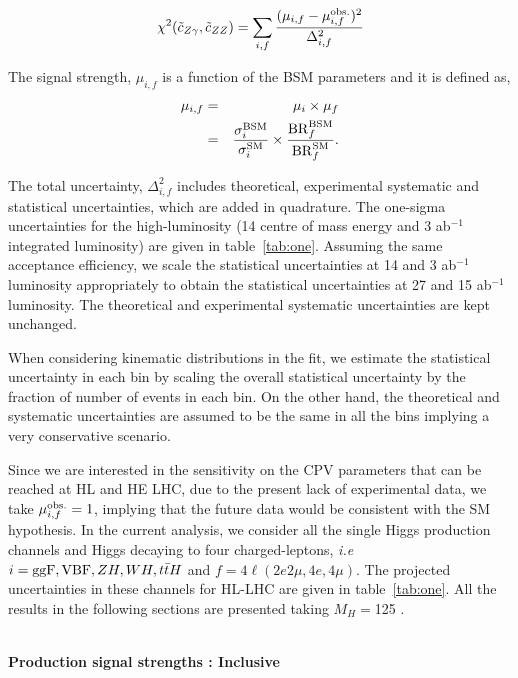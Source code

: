 \begin{equation}
 \chi^2(\tilde c_{Z\gamma},\tilde c_{ZZ}) = \sum_{i,f} \frac{(\mu_{i,f} -\mu_{i,f}^{\rm obs.})^2}{\Delta_{i,f}^2}
\end{equation}
{
The signal strength, $\mu_{i,f}$ is a function of the BSM parameters and it is defined as, 
\begin{eqnarray}
 \mu_{i,f} &=& \mu_i \times \mu_f \\
         &=& \frac{\sigma_i^{\rm BSM}}{\sigma_i^{\rm SM}} \times \frac{{\rm BR}_f^{ \rm BSM}}{{\rm BR}_f^{ \rm SM}}.
\end{eqnarray}

The total uncertainty, $\Delta_{i,f}^2$ includes theoretical, experimental systematic and statistical uncertainties, which 
are added in quadrature.
The one-sigma uncertainties for the high-luminosity (14 \UTeV centre of mass energy and 3 ab$^{-1}$ integrated luminosity) are given in table~\ref{tab:one}. 
Assuming the same acceptance efficiency, we scale the statistical uncertainties at 14 \UTeV and 3 ab$^{-1}$ luminosity appropriately 
to obtain the statistical uncertainties at 27 \UTeV and 15 ab$^{-1}$ 
luminosity. The theoretical and experimental systematic uncertainties are kept unchanged.

When considering kinematic distributions in the fit, we estimate the statistical uncertainty in each bin by scaling 
the overall statistical uncertainty by the fraction of number 
of events in each bin. On the other hand, the theoretical 
and systematic uncertainties are assumed to be the same in all the bins implying 
a very conservative scenario.


Since we are interested in the sensitivity on the CPV parameters that can be reached at HL and HE LHC, due to the present lack of experimental data, we take 
$\mu_{i,f}^{\rm obs.}=1$, implying that the future data would be consistent with the SM hypothesis. In the current analysis, we consider all the single Higgs production channels and Higgs decaying to four charged-leptons, {\it i.e} $i={{\rm ggF, VBF}, ZH, WH, t{\bar t}H}$ and $f=4\ell (2e2\mu, 4e, 4\mu)$. The projected uncertainties in these channels for HL-LHC are given in table~\ref{tab:one}. 
All the results in the following sections are presented taking $M_H=$125 \UGeV.
}\\

{\bf Production signal strengths : Inclusive} \\

